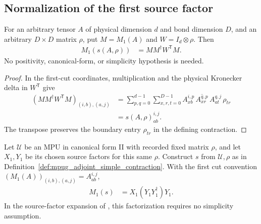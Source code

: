\subsection{Normalization of the first source factor}

\begin{lemma}
    \label{thm:mpug_raw_first_cut_contraction}
    \leanok
    For an arbitrary tensor $A$ of physical dimension $d$ and bond
    dimension $D$, and an arbitrary $D\times D$ matrix $\rho$, put
    $M=M_1(A)$ and $W=I_d\otimes\rho$. Then
    \begin{align}
        M_1(s(A,\rho)) & =MM^\dagger W^{\mathsf T}M.
        \label{eq:mpug_raw_first_cut_contraction}
    \end{align}
    No positivity, canonical-form, or simplicity hypothesis is needed.
\end{lemma}
\begin{proof}\leanok
    In the first-cut coordinates, multiplication and the physical
    Kronecker delta in $W^{\mathsf T}$ give
    \begin{align}
        (MM^\dagger W^{\mathsf T}M)_{(i,b),(a,j)}
         & =\sum_{p,q=0}^{d-1}\sum_{x,r,t=0}^{D-1}
        A^{i,p}_{xb}\,\overline{A^{q,p}_{xr}}\,
        A^{q,j}_{at}\,\rho_{tr}                    \\
         & =s(A,\rho)^{i,j}_{ab}.
    \end{align}
    The transpose preserves the boundary entry $\rho_{tr}$ in the
    defining contraction.
\end{proof}

\begin{lemma}
    \label{thm:mpug_first_cut_adjoint_contraction}
    \leanok
    Let $\mathcal U$ be an MPU in canonical form II with recorded fixed
    matrix $\rho$, and let $X_1,Y_1$ be its chosen source factors for this
    same $\rho$. Construct $s$ from $\mathcal U,\rho$ as in
    Definition~\ref{def:mpug_adjoint_simple_contraction}. With the first
    cut convention $(M_1(A))_{(i,b),(a,j)}=A^{i,j}_{ab}$,
    \begin{align}
        M_1(s) & =X_1(Y_1Y_1^\dagger)Y_1.
        \label{eq:mpug_first_cut_adjoint_contraction}
    \end{align}
    In the source-factor expansion of
    \cite[lines~1326--1374]{FrancoRubio2025MPUGauging}, this factorization
    requires no simplicity assumption.
\end{lemma}

